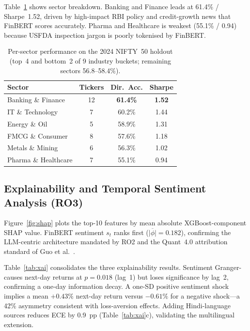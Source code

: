 \documentclass[12pt,a4paper]{article}
\begin{document}
Table~\ref{tab:sector} shows sector breakdown. Banking and Finance leads at
61.4\% / Sharpe~1.52, driven by high-impact RBI policy and credit-growth news
that FinBERT scores accurately. Pharma and Healthcare is weakest (55.1\% / 0.94)
because USFDA inspection jargon is poorly tokenised by FinBERT.

\begin{table}[h]
\centering
\caption{Per-sector performance on the 2024 NIFTY~50 holdout (top~4 and
bottom~2 of 9 industry buckets; remaining sectors 56.8--58.4\%).}
\label{tab:sector}
\footnotesize
\begin{tabular}{lccc}
\toprule
\textbf{Sector} & \textbf{Tickers} & \textbf{Dir.\ Acc.} & \textbf{Sharpe} \\
\midrule
Banking \& Finance   & 12 & \textbf{61.4\%} & \textbf{1.52} \\
IT \& Technology     & 7  & 60.2\% & 1.44 \\
Energy \& Oil        & 5  & 58.9\% & 1.31 \\
FMCG \& Consumer     & 8  & 57.6\% & 1.18 \\
\midrule
Metals \& Mining     & 6  & 56.3\% & 1.02 \\
Pharma \& Healthcare & 7  & 55.1\% & 0.94 \\
\bottomrule
\end{tabular}
\end{table}

\subsection{Explainability and Temporal Sentiment Analysis (RO3)}

Figure~\ref{fig:shap} plots the top-10 features by mean absolute
XGBoost-component SHAP value. FinBERT sentiment $s_t$ ranks first
($\overline{|\phi|}=0.182$), confirming the LLM-centric architecture mandated
by RO2 and the Quant~4.0 attribution standard of Guo et al.\ \cite{r9}.

Table~\ref{tab:xai} consolidates the three explainability results. Sentiment
Granger-causes next-day returns at $p=0.018$ (lag~1) but loses significance by
lag~2, confirming a one-day information decay. A one-SD positive sentiment shock
implies a mean $+0.43\%$ next-day return versus $-0.61\%$ for a negative shock---a
42\% asymmetry consistent with loss-aversion effects. Adding Hindi-language sources
reduces ECE by 0.9~pp (Table~\ref{tab:xai}c), validating the multilingual extension.
\end{document}
